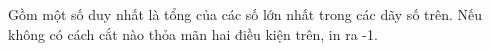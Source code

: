 Gồm một số duy nhất là tổng của các số lớn nhất trong các dãy số trên. Nếu không có cách cắt nào thỏa mãn hai điều kiện trên, in ra -1.